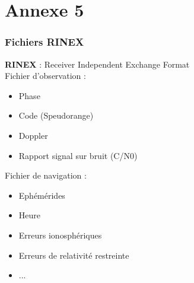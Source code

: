 \documentclass[xcolor=dvipsnames,envcountsect]{beamer}
\begin{document}
\section{Annexe 5}
\begin{frame}
	\label{appendix:5}
	\frametitle{Fichiers RINEX}
	\textbf{RINEX} : Receiver Independent Exchange Format \\
	Fichier d'observation : \\
	\begin{itemize}
		\item Phase
		\item Code (Speudorange)
		\item Doppler
		\item Rapport signal sur bruit (C/N0) 
	\end{itemize}
	Fichier de navigation : \\
	\begin{itemize}
		\item Ephémérides
		\item Heure
		\item Erreurs ionosphériques
		\item Erreurs de relativité restreinte
		\item ...
	\end{itemize}
\end{frame}
\end{document}
